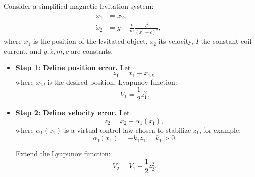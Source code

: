 \begin{example}



Consider a simplified magnetic levitation system:
\begin{align}
    \dot{x}_1 &= x_2, \\
    \dot{x}_2 &= g - \frac{k}{m}\frac{I^2}{(x_1 + c)^2},
\end{align}
where $x_1$ is the position of the levitated object, $x_2$ its velocity, $I$ the constant coil current, and $g, k, m, c$ are constants.  

\begin{center}
\end{center}

\begin{itemize}
    \item \textbf{Step 1: Define position error.} Let
    \[
        z_1 = x_1 - x_{1d},
    \]
    where $x_{1d}$ is the desired position. Lyapunov function:
    \[
        V_1 = \frac{1}{2} z_1^2.
    \]

    \item \textbf{Step 2: Define velocity error.} Let
    \[
        z_2 = x_2 - \alpha_1(x_1),
    \]
    where $\alpha_1(x_1)$ is a virtual control law chosen to stabilize $z_1$, for example:
    \[
        \alpha_1(x_1) = -k_1 z_1, \quad k_1>0.
    \]
    
    Extend the Lyapunov function:
    \[
        V_2 = V_1 + \frac{1}{2} z_2^2.
    \]


\end{itemize}
\end{example}
